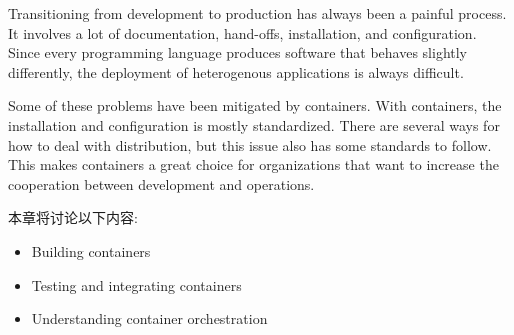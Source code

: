 
Transitioning from development to production has always been a painful process. It involves a lot of documentation, hand-offs, installation, and configuration. Since every programming language produces software that behaves slightly differently, the deployment of heterogenous applications is always difficult.

Some of these problems have been mitigated by containers. With containers, the installation and configuration is mostly standardized. There are several ways for how to deal with distribution, but this issue also has some standards to follow. This makes containers a great choice for organizations that want to increase the cooperation between development and operations.

本章将讨论以下内容:

\begin{itemize}
\item 
Building containers

\item 
Testing and integrating containers

\item 
Understanding container orchestration
\end{itemize}